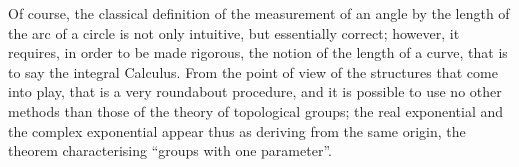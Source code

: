 Of course, the classical definition of the measurement of an angle by the length of the arc of a circle is not only intuitive, but essentially correct; however, it requires, in order to be made rigorous, the notion of the length of a curve, that is to say the integral Calculus. From the point of view of the structures that come into play, that is a very roundabout procedure, and it is possible to use no other methods than those of the theory of topological groups; the real exponential and the complex exponential appear thus as deriving from the same origin, the theorem characterising ``groups with one parameter''.

